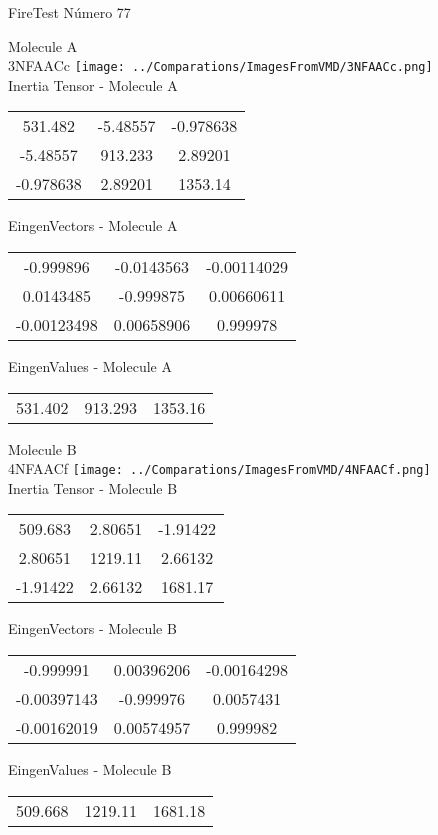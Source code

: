 \vtab[-2cm]
\begin{center}
{\large FireTest \tab Número 77}
\end{center}
\begin{multicols}{2}
\begin{center}

Molecule A \\ 
3NFAACc
\texttt{[image: ../Comparations/ImagesFromVMD/3NFAACc.png]}
\\
Inertia Tensor - Molecule A \\
\vtab

\begin{tabular}{|c c c|}
531.482	 & 	-5.48557	 & 	-0.978638	 \\
-5.48557	 & 	913.233	 & 	2.89201	 \\
-0.978638	 & 	2.89201	 & 	1353.14
\end{tabular}

\vtab
 EingenVectors - Molecule A     \\
\vtab
\begin{tabular}{|c c c|}
-0.999896	 & 	-0.0143563	 & 	-0.00114029	 \\
0.0143485	 & 	-0.999875	 & 	0.00660611	 \\
-0.00123498	 & 	0.00658906	 & 	0.999978
\end{tabular}

\vtab
 EingenValues - Molecule A     \\
\vtab
\begin{tabular}{|c c c|}
531.402	 & 	913.293	 & 	1353.16	 \\
\end{tabular}
\columnbreak

Molecule B \\ 
4NFAACf
\texttt{[image: ../Comparations/ImagesFromVMD/4NFAACf.png]}
\\
Inertia Tensor - Molecule B \\
\vtab

\begin{tabular}{|c c c|}
509.683	 & 	2.80651	 & 	-1.91422	 \\
2.80651	 & 	1219.11	 & 	2.66132	 \\
-1.91422	 & 	2.66132	 & 	1681.17
\end{tabular}

\vtab
 EingenVectors - Molecule B     \\
\vtab
\begin{tabular}{|c c c|}
-0.999991	 & 	0.00396206	 & 	-0.00164298	 \\
-0.00397143	 & 	-0.999976	 & 	0.0057431	 \\
-0.00162019	 & 	0.00574957	 & 	0.999982
\end{tabular}

\vtab
 EingenValues - Molecule B     \\
\vtab
\begin{tabular}{|c c c|}
509.668	 & 	1219.11	 & 	1681.18	 \\
\end{tabular}

\end{center}
\end{multicols}
